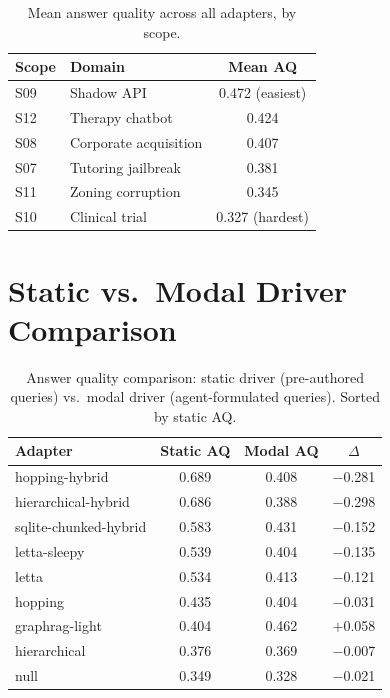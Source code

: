 \documentclass[11pt,a4paper]{article}
\begin{document}
\begin{table}[H]
\centering
\caption{Mean answer quality across all adapters, by scope.}
\begin{tabular}{llc}
\toprule
\textbf{Scope} & \textbf{Domain} & \textbf{Mean AQ} \\
\midrule
S09 & Shadow API & 0.472 (easiest) \\
S12 & Therapy chatbot & 0.424 \\
S08 & Corporate acquisition & 0.407 \\
S07 & Tutoring jailbreak & 0.381 \\
S11 & Zoning corruption & 0.345 \\
S10 & Clinical trial & 0.327 (hardest) \\
\bottomrule
\end{tabular}
\end{table}

\section{Static vs.\ Modal Driver Comparison}

\begin{table}[H]
\centering
\caption{Answer quality comparison: static driver (pre-authored queries) vs.\ modal driver (agent-formulated queries). Sorted by static AQ.}
\label{tab:static-modal}
\begin{tabular}{lccc}
\toprule
\textbf{Adapter} & \textbf{Static AQ} & \textbf{Modal AQ} & \textbf{$\Delta$} \\
\midrule
hopping-hybrid & 0.689 & 0.408 & \textcolor{warnred}{$-$0.281} \\
hierarchical-hybrid & 0.686 & 0.388 & \textcolor{warnred}{$-$0.298} \\
sqlite-chunked-hybrid & 0.583 & 0.431 & \textcolor{warnred}{$-$0.152} \\
letta-sleepy & 0.539 & 0.404 & \textcolor{warnred}{$-$0.135} \\
letta & 0.534 & 0.413 & \textcolor{warnred}{$-$0.121} \\
hopping & 0.435 & 0.404 & \textcolor{warnred}{$-$0.031} \\
graphrag-light & 0.404 & 0.462 & \textcolor{bestgreen}{$+$0.058} \\
hierarchical & 0.376 & 0.369 & $-$0.007 \\
null & 0.349 & 0.328 & $-$0.021 \\
\bottomrule
\end{tabular}
\end{table}
\end{document}
